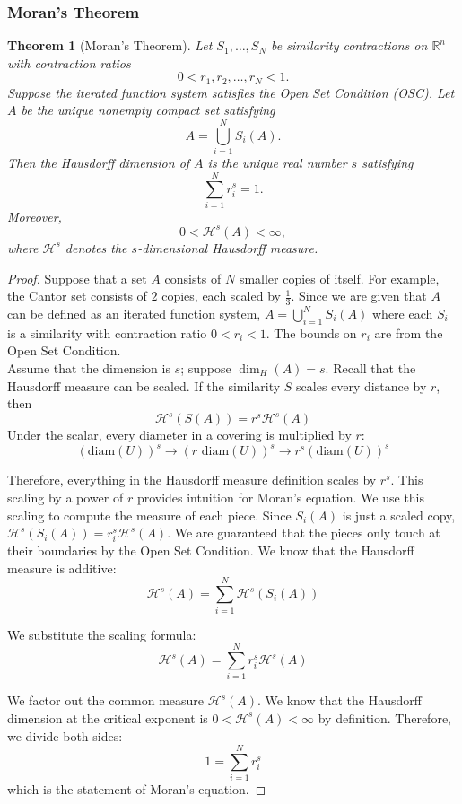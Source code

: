 \documentclass{article}
\newtheorem{theorem}{Theorem}
\begin{document}
\subsubsection{Moran's Theorem}

\begin{theorem}[Moran's Theorem]
Let $S_1,\dots,S_N$ be similarity contractions on $\mathbb{R}^n$ with
contraction ratios
\[
0<r_1,r_2,\dots,r_N<1.
\]
Suppose the iterated function system satisfies the Open Set Condition (OSC).
Let $A$ be the unique nonempty compact set satisfying
\[
A=\bigcup_{i=1}^{N} S_i(A).
\]
Then the Hausdorff dimension of $A$ is the unique real number $s$ satisfying
\[
\sum_{i=1}^{N} r_i^s=1.
\]
Moreover,
\[
0<\mathcal{H}^s(A)<\infty,
\]
where $\mathcal{H}^s$ denotes the $s$-dimensional Hausdorff measure.
\end{theorem}

\vspace{0.5em}

\begin{proof}
Suppose that a set $A$ consists of $N$ smaller copies of itself. For example, the Cantor set consists of $2$ copies, each scaled by $\frac{1}{3}$. Since we are given that $A$ can be defined as an iterated function system, $A =  \bigcup_{i=1}^{N} S_i(A)$ where each $S_i$ is a similarity with contraction ratio $0<r_i<1$. The bounds on $r_i$ are from the Open Set Condition. \\

Assume that the dimension is $s$; suppose $\dim_{H}(A) = s$. Recall that the Hausdorff measure can be scaled. If the similarity $S$ scales every distance by $r$, then $$\mathcal{H}^{s}(S(A)) = r^s\mathcal{H}^s(A)$$
Under the scalar, every diameter in a covering is multiplied by $r$:
$$(\text{diam}(U))^{s}  \rightarrow (r \text{ diam}(U))^{s} \rightarrow r^{s}(\text{diam}(U))^{s}$$

Therefore, everything in the Hausdorff measure definition scales by $r^s$. This scaling by a power of $r$ provides intuition for Moran's equation. We use this scaling to compute the measure of each piece. Since $S_i(A)$ is just a scaled copy, $\mathcal{H}^{s}(S_i(A)) = r_i^{s} \mathcal{H}^{s}(A)$. We are guaranteed that the pieces only touch at their boundaries by the Open Set Condition. We know that the Hausdorff measure is additive:
$$\mathcal{H}^{s}(A) = \sum_{i=1}^{N} \mathcal{H}^{s}(S_i(A))$$

We substitute the scaling formula:
$$\mathcal{H}^{s}(A) = \sum_{i=1}^{N}r_i^{s} \mathcal{H}^{s}(A)$$

We factor out the common measure $\mathcal{H}^{s}(A)$. We know that the Hausdorff dimension at the critical exponent is $0 < \mathcal{H}^{s}(A) < \infty$ by definition. Therefore, we divide both sides: $$1 = \sum_{i=1}^{N} r_i^{s}$$
which is the statement of Moran's equation.

\end{proof}
\end{document}
